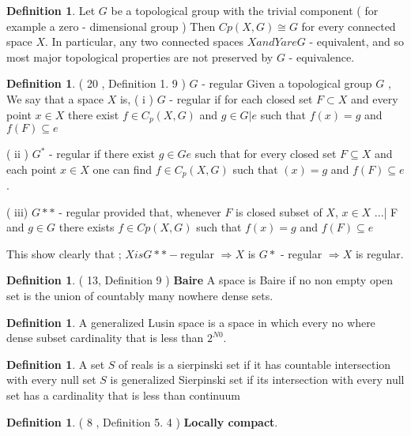 \documentclass[PhD,14,a4paper]{report}
\theoremstyle{plain}
\theoremstyle{definition}
\newtheorem{defn}[thm]{Definition}
\theoremstyle{remark}
\numberwithin{figure}{section}
\numberwithin{equation}{subsection}
\begin{document}
{\begin{defn}
Let $G$ be a topological group with the trivial component ( for example a zero - dimensional group ) Then $Cp ( X, G ) \cong{G}$ for every connected space $X$. In particular, any two connected spaces $X and Y are G$ - equivalent, and so most major topological properties are not preserved by $G$ - equivalence.
\end{defn}

\begin{defn}
 ( 20 , Definition 1. 9 ) $G$ - regular
Given a topological group $G$ , We say that a space $X$ is,
( i ) $G$ - regular if for each closed set $ F \subset {X}$ and every point $ x \in X$  there exist $f\in {C_{p} ( X, G )}$ and $g\in{G} |{ e }$ such that $f ( x ) = g$ and $f ( F )\subseteq  { e }$

( ii ) $G^{*}$ - regular if there exist $ g\in G \textit{e} $ such that for every closed set $F \subseteq X$ and each point $x\in X$  one can find $f\in C_{p} ( X, G )$ such that $ ( x ) =g$ and $f ( F ) \subseteq { e}$.

( iii) $G**$ - regular provided that, whenever $F$ is closed subset of $X$, $x\in{X}$ ...| F and $g\in{G}$ there exists $f\in{Cp ( X, G )}$  such that $f ( x )= g$ and $f (F )\subseteq { e }$

This show clearly that ; $X is G** - $regular $ \Rightarrow { X}$ is $G*$ - regular $\Rightarrow{ X}$ is regular.
\end{defn}

\begin{defn}
 ( 13, Definition 9 )\textbf{ Baire}
A space  is Baire if no non empty open set is the union of countably many nowhere dense sets.
\end{defn}




\begin{defn}
A generalized Lusin space is a space in which every no where dense  subset cardinality that is less than $2^{ N0}$.
\end{defn}


\begin{defn}
A set $S$ of reals is a sierpinski set if it has countable intersection with every null set $S$ is generalized Sierpinski set if its intersection with every null set has a cardinality that is less than continuum
\end{defn}

\begin{defn}
 ( 8 , Definition 5. 4 )\textbf{ Locally compact}.


\end{defn}}
\end{document}
